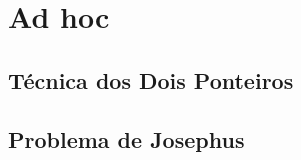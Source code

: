 \section{Ad hoc}
\subsection{Técnica dos Dois Ponteiros}
\subsection{Problema de Josephus}

\newpage